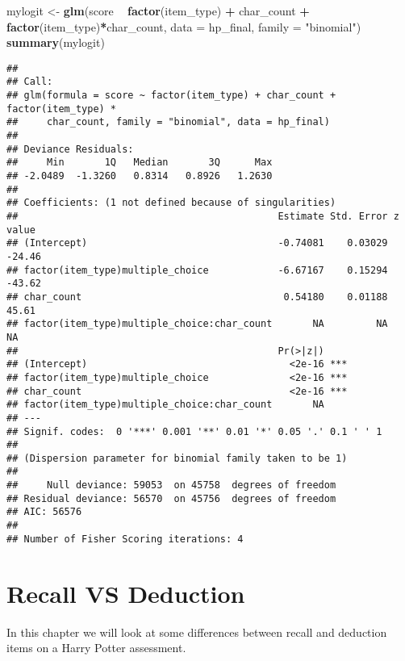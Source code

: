 \documentclass[]{book}
\newenvironment{Shaded}{\begin{snugshade}}{\end{snugshade}}
\newcommand{\KeywordTok}[1]{\textcolor[rgb]{0.13,0.29,0.53}{\textbf{#1}}}
\newcommand{\DataTypeTok}[1]{\textcolor[rgb]{0.13,0.29,0.53}{#1}}
\newcommand{\StringTok}[1]{\textcolor[rgb]{0.31,0.60,0.02}{#1}}
\newcommand{\OperatorTok}[1]{\textcolor[rgb]{0.81,0.36,0.00}{\textbf{#1}}}
\newcommand{\NormalTok}[1]{#1}
\theoremstyle{definition}
\theoremstyle{definition}
\theoremstyle{definition}
\theoremstyle{remark}
\begin{document}
\begin{Shaded}
\begin{Highlighting}[]
\NormalTok{mylogit <-}\StringTok{ }\KeywordTok{glm}\NormalTok{(score }\OperatorTok{~}\StringTok{ }\KeywordTok{factor}\NormalTok{(item_type) }\OperatorTok{+}\StringTok{ }\NormalTok{char_count }\OperatorTok{+}\StringTok{ }\KeywordTok{factor}\NormalTok{(item_type)}\OperatorTok{*}\NormalTok{char_count, }\DataTypeTok{data =}\NormalTok{ hp_final, }\DataTypeTok{family =} \StringTok{"binomial"}\NormalTok{)}
\KeywordTok{summary}\NormalTok{(mylogit) }
\end{Highlighting}
\end{Shaded}

\begin{verbatim}
## 
## Call:
## glm(formula = score ~ factor(item_type) + char_count + factor(item_type) * 
##     char_count, family = "binomial", data = hp_final)
## 
## Deviance Residuals: 
##     Min       1Q   Median       3Q      Max  
## -2.0489  -1.3260   0.8314   0.8926   1.2630  
## 
## Coefficients: (1 not defined because of singularities)
##                                             Estimate Std. Error z value
## (Intercept)                                 -0.74081    0.03029  -24.46
## factor(item_type)multiple_choice            -6.67167    0.15294  -43.62
## char_count                                   0.54180    0.01188   45.61
## factor(item_type)multiple_choice:char_count       NA         NA      NA
##                                             Pr(>|z|)    
## (Intercept)                                   <2e-16 ***
## factor(item_type)multiple_choice              <2e-16 ***
## char_count                                    <2e-16 ***
## factor(item_type)multiple_choice:char_count       NA    
## ---
## Signif. codes:  0 '***' 0.001 '**' 0.01 '*' 0.05 '.' 0.1 ' ' 1
## 
## (Dispersion parameter for binomial family taken to be 1)
## 
##     Null deviance: 59053  on 45758  degrees of freedom
## Residual deviance: 56570  on 45756  degrees of freedom
## AIC: 56576
## 
## Number of Fisher Scoring iterations: 4
\end{verbatim}

\chapter{Recall VS Deduction}\label{recall-vs-deduction}

In this chapter we will look at some differences between recall and
deduction items on a Harry Potter assessment.
\end{document}

